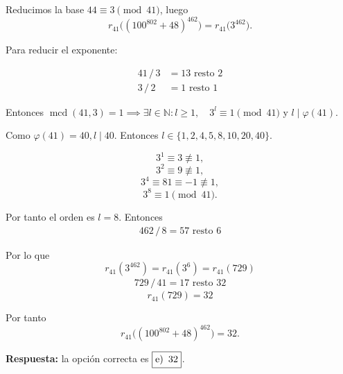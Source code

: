 \documentclass[a4paper,12pt]{article}
\begin{document}
\begin{ejercicioExamen}[title=Ejercicio 4]
    
Reducimos la base \(44 \equiv 3 \pmod{41}\), luego
\[
r_{41}\big((100^{802}+48)^{462}\big) = r_{41}\big(3^{462}\big).
\]

Para reducir el exponente:

\[
\begin{aligned}
41\,/\,3 &= 13 \text{ resto } 2 \\
3\,/\,2 &= 1 \text{ resto } \boxed{1}
\end{aligned}
\]

Entonces $\operatorname{mcd}(41,3) = 1 \implies \exists l \in \mathbb{N} : l \ge 1, \quad 3^l \equiv 1 \pmod{41}$ y $l \mid \varphi(41)$.

\vspace{0.5em}

Como $\varphi(41) = 40, l \mid 40$. Entonces \(l \in\{1,2,4,5,8,10,20,40\}\).

\[
3^1 \equiv 3 \not\equiv 1,
\]
\[
3^2 \equiv 9 \not\equiv 1,
\]
\[
3^4 \equiv 81 \equiv -1 \not\equiv 1,
\]
\[
3^8 \equiv 1 \pmod{41}.
\]

Por tanto el orden es \(l=8\). Entonces
\[
\begin{aligned}
462 \, / \, 8 = 57 \text{ resto } 6
\end{aligned}
\]

Por lo que
\[
r_{41}(3^{462}) = r_{41}(3^6) = r_{41}(729)
\]
\[
\begin{aligned}
729 \, / \, 41 = 17 \text{ resto } 32
\end{aligned}
\]
\[
r_{41}(729) = 32
\]

Por tanto
\[
r_{41}\big((100^{802}+48)^{462}\big) = 32.
\]

\medskip
\textbf{Respuesta:} la opción correcta es \(\boxed{$e)$\,\,\,32}\).

\end{ejercicioExamen}
\end{document}

